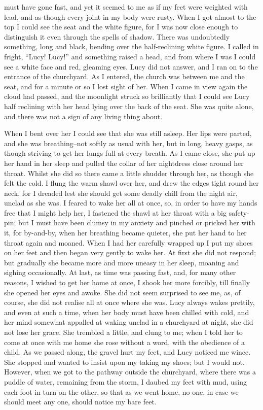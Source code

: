 \documentclass[12pt,openright]{book}
\begin{document}
must have gone fast, and yet it seemed to me as if my feet were weighted with lead, and as though every joint in my body were rusty. When I got almost to the top I could see the seat and the white figure, for I was now close enough to distinguish it even through the spells of shadow. There was undoubtedly something, long and black, bending over the half-reclining white figure. I called in fright, “Lucy! Lucy!” and something raised a head, and from where I was I could see a white face and red, gleaming eyes. Lucy did not answer, and I ran on to the entrance of the churchyard. As I entered, the church was between me and the seat, and for a minute or so I lost sight of her. When I came in view again the cloud had passed, and the moonlight struck so brilliantly that I could see Lucy half reclining with her head lying over the back of the seat. She was quite alone, and there was not a sign of any living thing about.

When I bent over her I could see that she was still asleep. Her lips were parted, and she was breathing–not softly as usual with her, but in long, heavy gasps, as though striving to get her lungs full at every breath. As I came close, she put up her hand in her sleep and pulled the collar of her nightdress close around her throat. Whilst she did so there came a little shudder through her, as though she felt the cold. I flung the warm shawl over her, and drew the edges tight round her neck, for I dreaded lest she should get some deadly chill from the night air, unclad as she was. I feared to wake her all at once, so, in order to have my hands free that I might help her, I fastened the shawl at her throat with a big safety-pin; but I must have been clumsy in my anxiety and pinched or pricked her with it, for by-and-by, when her breathing became quieter, she put her hand to her throat again and moaned. When I had her carefully wrapped up I put my shoes on her feet and then began very gently to wake her. At first she did not respond; but gradually she became more and more uneasy in her sleep, moaning and sighing occasionally. At last, as time was passing fast, and, for many other reasons, I wished to get her home at once, I shook her more forcibly, till finally she opened her eyes and awoke. She did not seem surprised to see me, as, of course, she did not realise all at once where she was. Lucy always wakes prettily, and even at such a time, when her body must have been chilled with cold, and her mind somewhat appalled at waking unclad in a churchyard at night, she did not lose her grace. She trembled a little, and clung to me; when I told her to come at once with me home she rose without a word, with the obedience of a child. As we passed along, the gravel hurt my feet, and Lucy noticed me wince. She stopped and wanted to insist upon my taking my shoes; but I would not. However, when we got to the pathway outside the churchyard, where there was a puddle of water, remaining from the storm, I daubed my feet with mud, using each foot in turn on the other, so that as we went home, no one, in case we should meet any one, should notice my bare feet.
\end{document}
